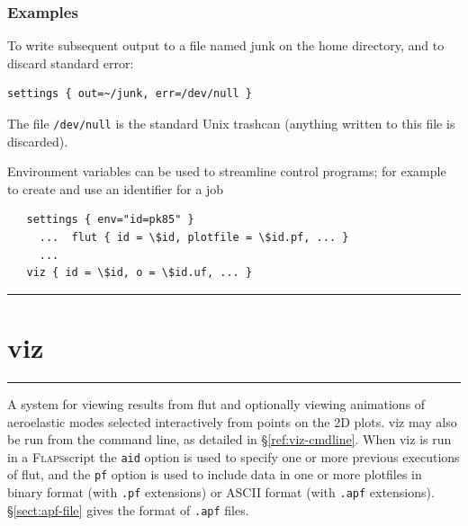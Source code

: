 \documentclass[11pt,openany,twoside]{book}
\makeatletter
\numberwithin{equation}{section}		%
\newcommand{\Cmd}[1]{{\sf #1}}
\newcommand{\Code}[1]{{\small\tt #1}}
\newcommand{\Flaps}{\textsc{Flaps\:}}
\newcommand{\Manpg}[1]{
	\hspace{-\parindent}\rule[-5mm]{\textwidth}{0.3mm}
	\newpage
	\section[\Cmd{#1}]{\sf\Large{#1}} \label{ref:#1} \index{#1@\Cmd{#1}!reference}
	\rule[5mm]{\textwidth}{0.3mm}
}
\newcommand{\Sectref}[1]{\S\ref{#1}}
\makeatother
\begin{document}
\subsubsection{Examples}
To write subsequent output to a file named junk on the
home directory, and to discard standard error:
\begin{lstlisting}
settings { out=~/junk, err=/dev/null }
\end{lstlisting}
The file \Code{/dev/null} is the standard Unix trashcan
(anything written to this file is discarded).

% 
\par
Environment variables can be used to streamline control programs;
for example to create and use an identifier for a job 
\begin{lstlisting}
   settings { env="id=pk85" }
     ...  flut { id = \$id, plotfile = \$id.pf, ... }
     ...
   viz { id = \$id, o = \$id.uf, ... }
\end{lstlisting}


\Manpg{viz}

A system for viewing results from \Cmd{flut}
and optionally viewing animations of aeroelastic modes selected
interactively from points on the 2D plots.
\Cmd{viz} may also be run from the command line, as detailed in
\Sectref{ref:viz-cmdline}.
When \Cmd{viz} is run in a \Flaps script the \Code{aid} option
is used to specify one or more previous executions of \Cmd{flut},
and the \Code{pf} option is used to include data in one or more
plotfiles in binary format (with \Code{.pf} extensions) or
ASCII format (with \Code{.apf} extensions).
\Sectref{sect:apf-file} gives the format of \Code{.apf} files.
\end{document}
